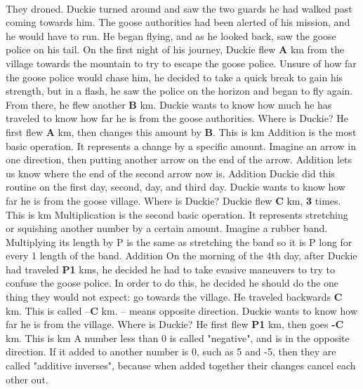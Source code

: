 \documentclass[a4paper,11pt ]{book}
\begin{document}
\paragraph{} They droned. Duckie turned around and saw the two guards he had walked past coming towards him. The goose authorities had been alerted of his mission, and he would have to run. He began flying, and as he looked back, saw the goose police on his tail. 
\vfill
\pagebreak
{On the first night of his journey, Duckie flew \textbf{A} km from the village towards the mountain to try to escape the goose police. Unsure of how far the goose police would chase him, he decided to take a quick break to gain his strength, but in a flash, he saw the police on the horizon and began to fly again. From there, he flew another \textbf{B} km. Duckie wants to know how much he has traveled to know how far he is from the goose authorities. Where is Duckie?}
{He first flew \textbf{A} km, then changes this amount by \textbf{B}. This is  km}
{Addition is the most basic operation. It represents a change by a specific amount. Imagine an arrow in one direction, then putting another arrow on the end of the arrow. Addition lets us know where the end of the second arrow now is.}
{Addition}
{Duckie did this routine on the first day, second, day, and third day.  Duckie wants to know how far he is from the goose village. Where is Duckie?}
{Duckie flew \textbf{C} km, \textbf{3} times. This is  km}
{Multiplication is the second basic operation. It represents stretching or squishing another number by a certain amount. Imagine a rubber band. Multiplying its length by P is the same as stretching the band so it is P long for every 1 length of the band.}
{Addition}
{On the morning of the 4th day, after Duckie had traveled \textbf{P1} kms, he decided he had to take evasive maneuvers to try to confuse the goose police. In order to do this, he decided he should do the one thing they would not expect: go towards the village. He traveled backwards \textbf{C} km. This is called –\textbf{C} km. \linebreak – means opposite direction. Duckie wants to know how far he is from the village. Where is Duckie?}
{He first flew \textbf{P1} km, then goes \textbf{-C} km. This is  km}
{A number less than 0 is called "negative", and is in the opposite direction. If it added to another number is 0, such as 5 and -5, then they are called "additive inverses", because when added together their changes cancel each other out.}
\end{document}
